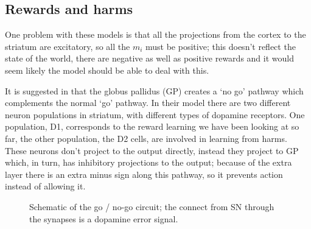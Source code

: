 \documentclass[11pt,a4paper]{scrartcl}
\begin{document}
\subsection*{Rewards and harms}
One problem with these models is that all the projections from the
cortex to the striatum are excitatory, so all the $m_i$ must be
positive; this doesn't reflect the state of the world, there are
negative as well as positive rewards and it would seem likely the
model should be able to deal with this.

It is suggested in \cite{FrankEtAl2004a} that the globus pallidus (GP)
creates a \lq{}no go\rq{} pathway which complements the normal
\lq{}go\rq{} pathway. In their model there are two different neuron
populations in striatum, with different types of dopamine
receptors. One population, D1, corresponds to the reward learning we
have been looking at so far, the other population, the D2 cells, are
involved in learning from harms. These neurons don't project to the
output directly, instead they project to GP which, in turn, has
inhibitory projections to the output; because of the extra layer there
is an extra minus sign along this pathway, so it prevents action
instead of allowing it.

\begin{figure}
\begin{center}
\end{center}
\caption{Schematic of the go / no-go circuit; the connect from SN through the synapses is a dopamine error signal.\label{fig:gng}}
\end{figure}
\end{document}
